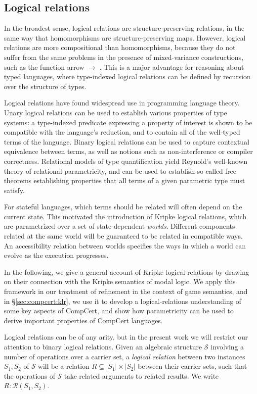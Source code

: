 \documentclass[acmsmall,timestamp,review]{acmart}
\begin{document}
\subsection{Logical relations} %

In the broadest sense,
logical relations are structure-preserving relations,
in the same way that homomorphisms are structure-preserving maps.
However,
logical relations are more compositional than homomorphisms,
because they do not suffer from the same problems
in the presence of mixed-variance constructions,
such as the function arrow $\rightarrow$ \cite{lrp}.
This is a major advantage
for reasoning about typed languages,
where type-indexed logical relations
can be defined by recursion over the structure of types.

Logical relations have found widespread use in programming language theory.
Unary logical relations can be used to establish
various properties of type systems:
a type-indexed predicate expressing a property of interest
is shown to be compatible with the language's reduction,
and to contain all of the well-typed terms of the language.
Binary logical relations can be used to capture
contextual equivalence between terms,
as well as notions such as non-interference or compiler correctness.
Relational models of type quantification yield
Reynold's well-known theory of relational parametricity,
and can be used to establish so-called free theorems
establishing properties that
all terms of a given parametric type must satisfy.

For stateful languages,
which terms should be related
will often depend on the current state.
This motivated the introduction of Kripke logical relations,
which are parametrized over a set of state-dependent \emph{worlds}.
Different components related at the same world
will be guaranteed to be related in compatible ways.
An accessibility relation between worlds
specifies the ways in which a world can evolve
as the execution progresses.

In the following,
we give a general account of Kripke logical relations
by drawing on their connection with
the Kripke semantics of modal logic.
We apply this framework
in our treatment of refinement
in the context of game semantics,
and in \S\ref{sec:compcert:klr},
we use it to develop a logical-relations
understanding of some key aspects of CompCert,
and show how parametricity
can be used to derive important properties
of CompCert languages.

Logical relations can be of any arity,
but in the present work
we will restrict our attention to
binary logical relations.
Given an algebraic structure $\mathcal{S}$
involving a number of operations over a carrier set,
a \emph{logical relation}
between two instances $S_1, S_2$ of $\mathcal{S}$
will be a relation $R \subseteq |S_1| \times |S_2|$
between their carrier sets,
such that the operations of $\mathcal{S}$
take related arguments to related results.
We write $R : \mathcal{R}(S_1, S_2)$.
\end{document}
